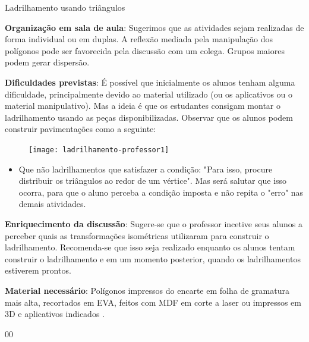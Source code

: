 \begin{sugestions}{Ladrilhamento usando triângulos}
{
\textbf{Organização em sala de aula}: Sugerimos que as atividades sejam realizadas de forma individual ou em duplas. A reflexão mediada pela manipulação dos polígonos pode ser favorecida pela discussão com um colega. Grupos maiores podem gerar dispersão.

\textbf{Dificuldades previstas}: É possível que inicialmente os alunos tenham alguma dificuldade, principalmente devido ao material utilizado (ou os aplicativos ou o material manipulativo). Mas a ideia é que os estudantes consigam montar o ladrilhamento usando as peças disponibilizadas.  Observar que os alunos podem construir pavimentações como a seguinte:

\begin{figure}[H]
\centering

\texttt{[image: ladrilhamento-professor1]}
\end{figure}

\begin{itemize}
\item Que não ladrilhamentos que satisfazer a condição: "Para isso, procure distribuir os triângulos ao redor de um vértice". Mas será salutar que isso ocorra, para que o aluno perceba a condição imposta e não repita o "erro" nas demais atividades.
\end{itemize}

\textbf{Enriquecimento da discussão}: Sugere-se que o professor incetive seus alunos a perceber quais as transformações isométricas utilizaram para construir o ladrilhamento. Recomenda-se que isso seja realizado enquanto os alunos tentam construir o ladrilhamento e em um momento posterior, quando os ladrilhamentos estiverem prontos.

\textbf{Material necessário}: Polígonos impressos do encarte em folha de gramatura mais alta, recortados em EVA, feitos com MDF em corte a laser ou impressos em 3D e aplicativos indicados .

}{0}{0}
\end{sugestions}
